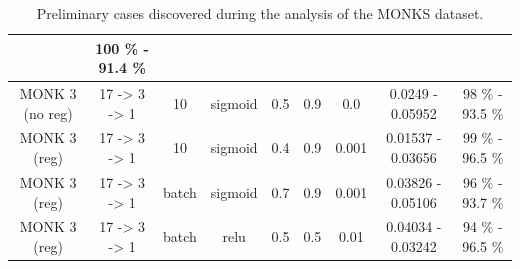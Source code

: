 \documentclass[11pt,twoside]{article}
\begin{document}
\begin{appendices}
\begin{table}[H]
\begin{subtable}{\textwidth}
{\begin{tabular}{| c | c | c | c | c | c | c | c | c |}
                    & 100 \% - 91.4 \% \\
                    \hline
                    MONK 3 (no reg) & 17 -> 3 -> 1 & 10 & sigmoid & 0.5 & 0.9 & 0.0 & 0.0249 - 0.05952
                    & 98 \% - 93.5 \% \\
                    \hline
                    MONK 3 (reg) & 17 -> 3 -> 1 & 10 & sigmoid & 0.4 & 0.9 & 0.001 & 0.01537 - 0.03656
                    & 99 \% - 96.5 \% \\
                    \hline
                    MONK 3 (reg) & 17 -> 3 -> 1 & batch & sigmoid & 0.7 & 0.9 & 0.001 & 0.03826 - 0.05106
                    & 96 \% - 93.7 \% \\
                    \hline
                    MONK 3 (reg) & 17 -> 3 -> 1 & batch & relu & 0.5 & 0.5 & 0.01 & 0.04034 - 0.03242
                    & 94 \% - 96.5 \% \\
                    \hline
                \end{tabular}
            }
        \end{subtable}
        \caption{Preliminary cases discovered during the analysis of the MONKS dataset.}
        \label{tab:monks_preliminary}
    \end{table}




\end{appendices}

\end{document}
